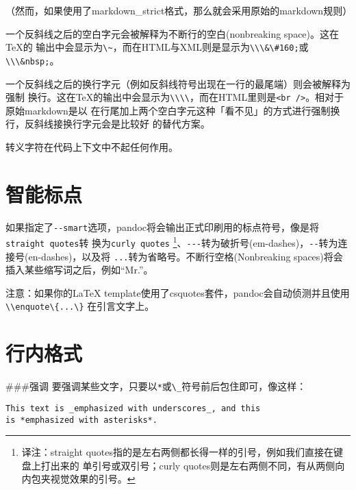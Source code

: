 \documentclass[cn]{elegantbook}
\newcommand{\passthrough}[1]{#1}
\begin{document}
（然而，如果使用了markdown\_strict格式，那么就会采用原始的markdown规则）

一个反斜线之后的空白字元会被解释为不断行的空白(nonbreaking
space)。这在TeX的
输出中会显示为\passthrough{\lstinline!\~!}，而在HTML与XML则是显示为\passthrough{\lstinline!\\\&\#160;!}或\passthrough{\lstinline!\\\&nbsp;!}。

一个反斜线之后的换行字元（例如反斜线符号出现在一行的最尾端）则会被解释为强制
换行。这在TeX的输出中会显示为\passthrough{\lstinline!\\\\!}，而在HTML里则是\passthrough{\lstinline!<br />!}。相对于原始markdown是以
在行尾加上两个空白字元这种「看不见」的方式进行强制换行，反斜线接换行字元会是比较好
的替代方案。

转义字符在代码上下文中不起任何作用。

\hypertarget{ux667aux80fdux6807ux70b9}{%
\section{智能标点}\label{ux667aux80fdux6807ux70b9}}

如果指定了\passthrough{\lstinline!--smart!}选项，pandoc将会输出正式印刷用的标点符号，像是将\passthrough{\lstinline!straight quotes!}转
换为\passthrough{\lstinline!curly quotes!} \footnote{译注：straight
  quotes指的是左右两侧都长得一样的引号，例如我们直接在键盘上打出来的
  单引号或双引号；curly
  quotes则是左右两侧不同，有从两侧向内包夹视觉效果的引号。}、\passthrough{\lstinline!---!}转为破折号(em-dashes)，\passthrough{\lstinline!--!}转为连接号(en-dashes)，以及将
\passthrough{\lstinline!...!}转为省略号。不断行空格(Nonbreaking
spaces)将会插入某些缩写词之后，例如``Mr.''。

注意：如果你的LaTeX
template使用了csquotes套件，pandoc会自动侦测并且使用\passthrough{\lstinline!\\enquote\{...\}!}
在引言文字上。

\hypertarget{ux884cux5185ux683cux5f0f}{%
\section{行内格式}\label{ux884cux5185ux683cux5f0f}}

\#\#\#强调
要强调某些文字，只要以\passthrough{\lstinline!*!}或\passthrough{\lstinline!\_!}符号前后包住即可，像这样：

\begin{lstlisting}
This text is _emphasized with underscores_, and this
is *emphasized with asterisks*.
\end{lstlisting}
\end{document}
